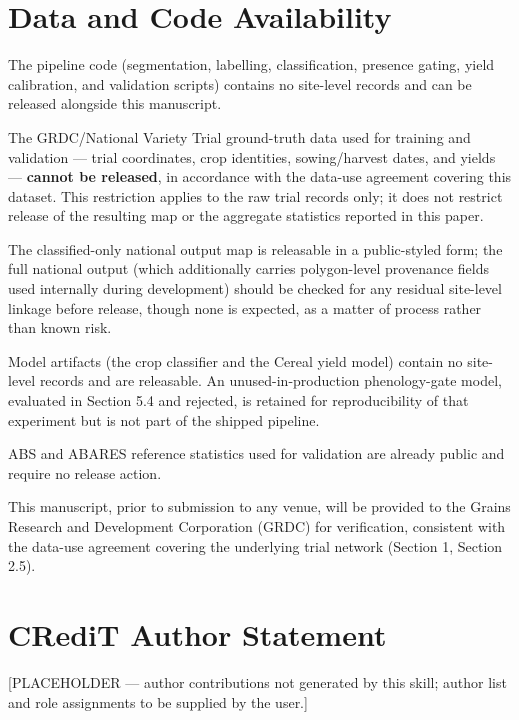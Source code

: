 
\section*{Data and Code Availability}\label{data-and-code-availability}

The pipeline code (segmentation, labelling, classification, presence gating, yield calibration, and validation scripts) contains no site-level records and can be released alongside this manuscript.

The GRDC/National Variety Trial ground-truth data used for training and validation --- trial coordinates, crop identities, sowing/harvest dates, and yields --- \textbf{cannot be released}, in accordance with the data-use agreement covering this dataset. This restriction applies to the raw trial records only; it does not restrict release of the resulting map or the aggregate statistics reported in this paper.

The classified-only national output map is releasable in a public-styled form; the full national output (which additionally carries polygon-level provenance fields used internally during development) should be checked for any residual site-level linkage before release, though none is expected, as a matter of process rather than known risk.

Model artifacts (the crop classifier and the Cereal yield model) contain no site-level records and are releasable. An unused-in-production phenology-gate model, evaluated in Section 5.4 and rejected, is retained for reproducibility of that experiment but is not part of the shipped pipeline.

ABS and ABARES reference statistics used for validation are already public and require no release action.

This manuscript, prior to submission to any venue, will be provided to the Grains Research and Development Corporation (GRDC) for verification, consistent with the data-use agreement covering the underlying trial network (Section 1, Section 2.5).

\section*{CRediT Author Statement}\label{credit-author-statement}

{[}PLACEHOLDER --- author contributions not generated by this skill; author list and role assignments to be supplied by the user.{]}

